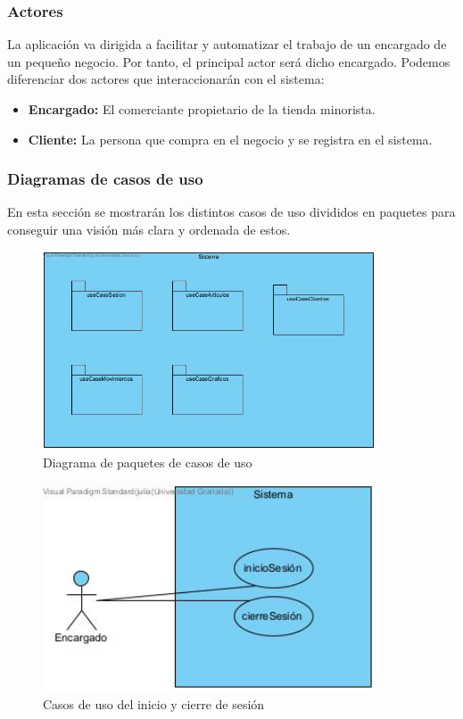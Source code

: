 \subsubsection{Actores}

La aplicación va dirigida a facilitar y automatizar el trabajo de un encargado de un pequeño negocio. Por tanto, el principal actor será dicho encargado. Podemos diferenciar dos actores que interaccionarán con el sistema: 

\begin{itemize}
	\item \textbf{Encargado:} El comerciante propietario de la tienda minorista. 
	\item \textbf{Cliente:} La persona que compra en el negocio y se registra en el sistema. 
\end{itemize}


\subsubsection{Diagramas de casos de uso}

En esta sección se mostrarán los distintos casos de uso divididos en paquetes para conseguir una visión más clara y ordenada de estos. 

\begin{figure}[H]
	\centering
	\includegraphics[width=0.88\textwidth]{imagenes/imagenesDiagramas/useCases/useCases.jpg}
	\caption{Diagrama de paquetes de casos de uso}
	\label{fig:usecase}
\end{figure}

\begin{figure}[H]
	\centering
	\includegraphics[width=0.88\textwidth]{imagenes/imagenesDiagramas/useCases/useCaseSesion.jpg}
	\caption{Casos de uso del inicio y cierre de sesión}
	\label{fig:usecaseSesion}
\end{figure}

